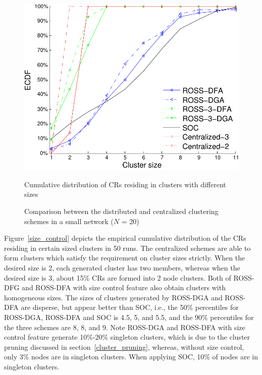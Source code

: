 \documentclass[10pt,journal,compsoc]{IEEEtran}
\theoremstyle{mytheoremstyle}
\theoremstyle{mytheoremstyle}
\theoremstyle{mytheoremstyle}
\newcommand{\ie}{i.e., }
\begin{document}
\begin{figure}[t]
\begin{multicols}{3}
    \includegraphics[width=\linewidth]{cdf_clusterSize_20.pdf}\par\caption{Cumulative distribution of CRs residing in clusters with different sizes}\label{size_control}
\end{multicols}
\caption{Comparison between the distributed and centralized clustering schemes in a small network ($N$ = 20)}
\label{compare_dis_centralized}
\end{figure}


Figure~\ref{size_control} depicts the empirical cumulative distribution of the CRs residing in certain sized clusters in 50 runs.
The centralized schemes are able to form clusters which satisfy the requirement on cluster sizes strictly.
When the desired size is 2, each generated cluster has two members, whereas when the desired size is 3, about 15\% CRs are formed into 2 node clusters.
Both of ROSS-DFG and ROSS-DFA with size control feature also obtain clusters with homogeneous sizes.
The sizes of clusters generated by ROSS-DGA and ROSS-DFA are disperse, but appear better than SOC, i.e., the 50\% percentiles for ROSS-DGA, ROSS-DFA and SOC is 4.5, 5, and 5.5, and the 90\% percentiles for the three schemes are 8, 8, and 9.
Note ROSS-DGA and ROSS-DFA with size control feature generate 10\%-20\% singleton clusters, which is due to the cluster pruning discussed in section~\ref{cluster_pruning}, whereas, without size control, only 3\% nodes are in singleton clusters.
When applying SOC, 10\% of nodes are in singleton clusters.
\end{document}
